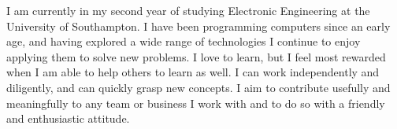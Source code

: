 
I am currently in my second year of studying Electronic Engineering at the University of Southampton. I have been programming computers since an early age, and having explored a wide range of technologies I continue to enjoy applying them to solve new problems. I love to learn, but I feel most rewarded when I am able to help others to learn as well. I can work independently and diligently, and can quickly grasp new concepts. I aim to contribute usefully and meaningfully to any team or business I work with and to do so with a friendly and enthusiastic attitude.
